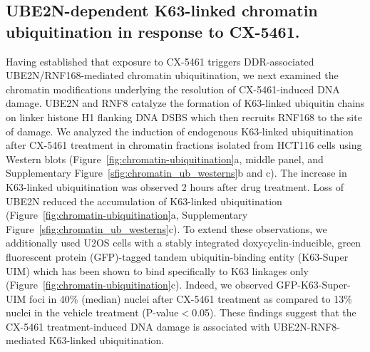 \subsection{UBE2N-dependent K63-linked chromatin ubiquitination in response to CX-5461.}
Having established that exposure to CX-5461 triggers DDR-associated UBE2N/RNF168-mediated chromatin ubiquitination, we next examined the chromatin modifications underlying the resolution of CX-5461-induced DNA damage. 
UBE2N and RNF8 catalyze the formation of K63-linked ubiquitin chains on linker histone H1 flanking DNA DSBS which then recruits RNF168 to the site of damage\cite{Thorslund2015}. 
We analyzed the induction of endogenous K63-linked ubiquitination after CX-5461 treatment in chromatin fractions isolated from HCT116 cells using Western blots (Figure~\ref{fig:chromatin-ubiquitination}a, middle panel, and Supplementary Figure~\ref{sfig:chromatin_ub_westerns}b and c). 
The increase in K63-linked ubiquitination was observed 2 hours after drug treatment. 
Loss of UBE2N reduced the accumulation of K63-linked ubiquitination (Figure~\ref{fig:chromatin-ubiquitination}a, Supplementary Figure~\ref{sfig:chromatin_ub_westerns}c). 
To extend these observations, we additionally used U2OS cells with a stably integrated doxycyclin-inducible, green fluorescent protein (GFP)-tagged tandem ubiquitin-binding entity (K63-Super UIM) which has been shown to bind specifically to K63 linkages only\cite{Thorslund2015} (Figure~\ref{fig:chromatin-ubiquitination}c). 
Indeed, we observed GFP-K63-Super-UIM foci in 40\% (median) nuclei after CX-5461 treatment as compared to 13\% nuclei in the vehicle treatment (P-value$<$0.05). 
These findings suggest that the CX-5461 treatment-induced DNA damage is associated with UBE2N-RNF8-mediated K63-linked ubiquitination. 

